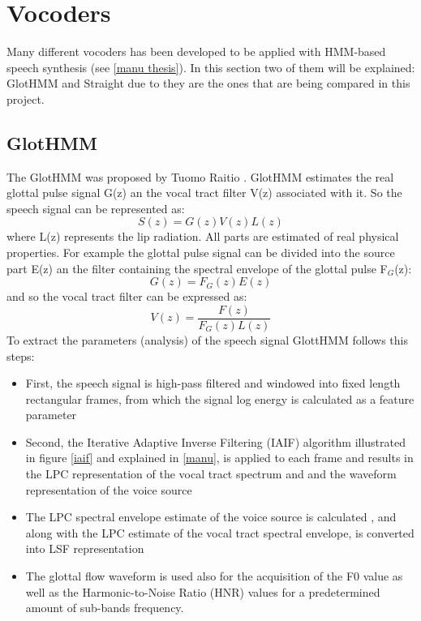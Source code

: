 \section{Vocoders}\label{voco-a-s}
Many different vocoders has been developed to be applied with HMM-based speech synthesis (see \ref{manu thesis}). In this section two of them will be explained: GlotHMM and Straight due to they are the ones that are being compared in this project.
\subsection{GlotHMM}\label{glotthmmvoco}
The GlotHMM was proposed by Tuomo Raitio \cite{tuomo}. GlotHMM estimates the real glottal pulse signal G(z) an the vocal tract filter V(z) associated with it. So the speech signal can be represented as:
\begin{equation}
	S(z) = G(z)V(z)L(z) 
\end{equation}
where L(z) represents the lip radiation. All parts are estimated of real physical properties. For example the glottal pulse signal can be divided into the source part E(z) an the filter containing the spectral envelope of the glottal pulse F$_{G}$(z):
\begin{equation}
	G(z) = F_{G}(z)E(z)
\end{equation}
and so the vocal tract filter can be expressed as:
\begin{equation}
	V(z) = \dfrac{F(z)}{F_{G}(z)L(z)} 
\end{equation} %
To extract the parameters (analysis) of the speech signal GlottHMM follows this steps:
\begin{itemize}
	\item First, the speech signal is high-pass filtered and windowed into fixed length rectangular frames, from which the signal log energy is calculated as a feature parameter
	\item Second, the Iterative Adaptive Inverse Filtering (IAIF) algorithm illustrated in figure \ref{iaif} and explained in \ref{manu}, is applied to each frame and results in the LPC representation of the vocal tract spectrum and and the waveform representation of the voice source
	\item The LPC spectral envelope estimate of the voice source is calculated , and along with the LPC estimate of the vocal tract spectral envelope, is converted into LSF representation
	\item The glottal flow waveform is used also for the acquisition of the F0 value as well as the Harmonic-to-Noise Ratio (HNR) values for a predetermined amount of sub-bands frequency. 
\end{itemize}
